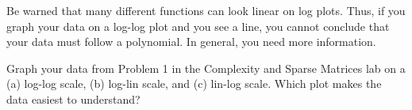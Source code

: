 Be warned that many different functions can look linear on log plots. 
Thus, if you graph your data on a log-log plot and you see a line, you cannot conclude that your data must follow a polynomial. 
In general, you need more information.


\begin{problem}
Graph your data from Problem 1 in the Complexity and Sparse Matrices lab on a (a) log-log scale, (b) log-lin scale, and (c) lin-log scale. 
Which plot makes the data easiest to understand?

\end{problem}
